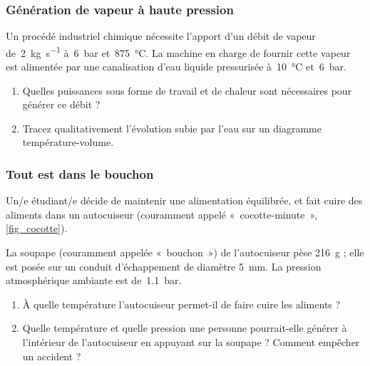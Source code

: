 \subsubsection{Génération de vapeur à haute pression}

	Un procédé industriel chimique nécessite l’apport d’un débit de vapeur de~\SI{2}{\kilogram\per\second} à~\SI{6}{\bar} et~\SI{875}{\degreeCelsius}. La machine en charge de fournir cette vapeur est alimentée par une canalisation d’eau liquide pressurisée à~\SI{10}{\degreeCelsius} et~\SI{6}{\bar}.

	\begin{enumerate}
		\item Quelles puissances sous forme de travail et de chaleur sont nécessaires pour générer ce débit ?
		\item Tracez qualitativement l’évolution subie par l’eau sur un diagramme température-volume.
	\end{enumerate}


\subsubsection{Tout est dans le bouchon}

	Un/e étudiant/e décide de maintenir une alimentation équilibrée, et fait cuire des aliments dans un autocuiseur (couramment appelé «~cocotte-minute~», \cref{fig_cocotte}). 
		
	La soupape (couramment appelée «~bouchon~») de l’autocuiseur pèse \SI{216}{\gram} ; elle est posée sur un conduit d’échappement de diamètre \SI{5}{\milli\metre}. La pression atmosphérique ambiante est de~\SI{1,1}{\bar}.
	
	\begin{enumerate}
		\item À quelle température l’autocuiseur permet-il de faire cuire les aliments ?
		\item Quelle température et quelle pression une personne pourrait-elle générer à l’intérieur de l’autocuiseur en appuyant sur la soupape ? Comment empêcher un accident ?
	\end{enumerate}

